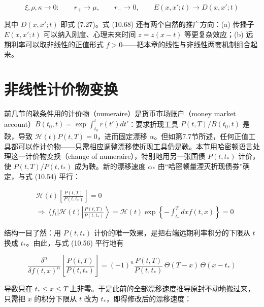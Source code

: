 \begin{equation*}
\xi,\rho,\kappa\to0:\qquad r_+\to\mu,\qquad r_-\to0,\qquad E(x,x';t)\to D(x,x';t)
\end{equation*}

其中 $D(x,x';t)$ 即式 (7.27)。式 (10.68) 还有两个自然的推广方向：(a) 传播子 $E(x,x';t)$ 可以纳入刚度、心理未来时间 $z=z(x-t)$ 等更复杂效应；(b) 远期利率可以取非线性的正值形式 $f>0$——把本章的线性与非线性两套机制组合起来。

\section{非线性计价物变换}

前几节的鞅条件用的计价物（numeraire）是货币市场账户（money market account）$B(t_0,t)=\exp\int_{t_0}^t r(t')dt'$：要求折现工具 $P(t,T)/B(t_0,t)$ 是鞅，导致 $\mathcal{H}(t)P(t,T)=0$，进而固定漂移 $\alpha$。但如第7.7节所述，任何正值工具都可以作计价物——只需相应调整漂移使折现工具仍是鞅。本节用哈密顿语言处理这一计价物变换（change of numeraire），特别地用另一张国债 $P(t,t_*)$ 计价，使 $P(t,T)/P(t,t_*)$ 成为鞅。新的漂移速度 $\alpha_*$ 由“哈密顿量湮灭折现债券”确定，与式 (10.54) 平行：

\begin{equation*}
\begin{aligned}
&\mathcal{H}(t)\left[\frac{P(t,T)}{P(t,t_*)}\right]=0\\
&\Rightarrow\ \langle f_t|\mathcal{H}(t)\left|\frac{P(t,T)}{P(t,t_*)}\right\rangle=\mathcal{H}(t)\exp\left\{-\int_{t_*}^T dxf(t,x)\right\}=0
\end{aligned}
\tag{10.69}
\end{equation*}

结构一目了然：用 $P(t,t_*)$ 计价的唯一效果，是把右端远期利率积分的下限从 $t$ 换成 $t_*$。由此，与式 (10.56) 平行地有

\begin{equation*}
\frac{\delta^n}{\delta f(t,x)^n}\left[\frac{P(t,T)}{P(t,t_*)}\right]=(-1)^n\frac{P(t,T)}{P(t,t_*)}\,\Theta(T-x)\,\Theta(x-t_*)
\tag{10.70}
\end{equation*}

导数只在 $t_*\le x\le T$ 上非零。于是此前的全部漂移速度推导原封不动地搬过来，只需把 $x$ 的积分下限从 $t$ 改为 $t_*$，即得修改后的漂移速度：

